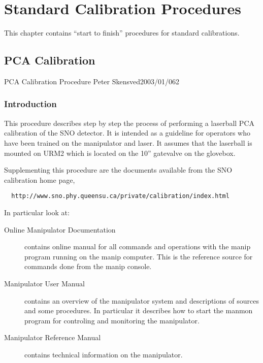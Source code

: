 
\section{Standard Calibration Procedures}
 
  This chapter contains ``start to finish'' procedures for
standard calibrations.
  
\newpage
\subsection{PCA Calibration}

             {PCA Calibration Procedure}
             {Peter Skensved}{2003/01/06}{2}

 

\subsubsection{Introduction}
  
  This procedure describes step by step the process of performing a
laserball PCA calibration of the SNO detector.  It is intended as
a guideline for operators who have been trained on the manipulator
and laser.  It assumes that the laserball is mounted on URM2 which
is located on the 10'' gatevalve on the glovebox.
  

  Supplementing this procedure are the documents available
from the SNO calibration home page,
\begin{verbatim}
  http://www.sno.phy.queensu.ca/private/calibration/index.html
\end{verbatim}
In particular look at:
\begin{description}
\item[Online Manipulator Documentation] contains online manual
  for all commands and operations with the manip program running
  on the manip computer.  This is the reference source for commands
  done from the manip console.
\item[Manipulator User Manual] contains an overview of the manipulator
  system and descriptions of sources and some procedures.  In particular
  it describes how to start the manmon program for controling and monitoring
  the manipulator.
\item[Manipulator Reference Manual] contains technical information on
  the manipulator.
\end{description}
 
